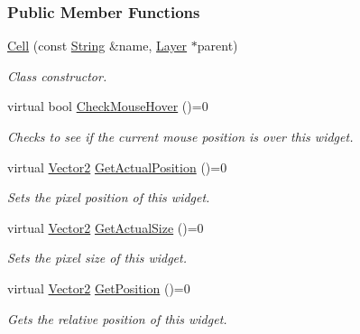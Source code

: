 \subsubsection*{Public Member Functions}
\begin{DoxyCompactItemize}
\item 
\hypertarget{classphys_1_1UI_1_1Cell_aef652c34ef1ea441cf00a4d757d41453}{
\hyperlink{classphys_1_1UI_1_1Cell_aef652c34ef1ea441cf00a4d757d41453}{Cell} (const \hyperlink{namespacephys_aa03900411993de7fbfec4789bc1d392e}{String} \&name, \hyperlink{classphys_1_1UI_1_1Layer}{Layer} $\ast$parent)}
\label{classphys_1_1UI_1_1Cell_aef652c34ef1ea441cf00a4d757d41453}

\begin{DoxyCompactList}\small\item\em Class constructor. \item\end{DoxyCompactList}\item 
virtual bool \hyperlink{classphys_1_1UI_1_1Cell_aff6472ccb5d6d7bd3e7d3a967c67674d}{CheckMouseHover} ()=0
\begin{DoxyCompactList}\small\item\em Checks to see if the current mouse position is over this widget. \item\end{DoxyCompactList}\item 
virtual \hyperlink{classphys_1_1Vector2}{Vector2} \hyperlink{classphys_1_1UI_1_1Cell_a1b0deb9738bc4da73e0be4dd355b23fb}{GetActualPosition} ()=0
\begin{DoxyCompactList}\small\item\em Sets the pixel position of this widget. \item\end{DoxyCompactList}\item 
virtual \hyperlink{classphys_1_1Vector2}{Vector2} \hyperlink{classphys_1_1UI_1_1Cell_a6301ce41a7a44a97de36fb54388ad430}{GetActualSize} ()=0
\begin{DoxyCompactList}\small\item\em Sets the pixel size of this widget. \item\end{DoxyCompactList}\item 
virtual \hyperlink{classphys_1_1Vector2}{Vector2} \hyperlink{classphys_1_1UI_1_1Cell_a17475dbdde2d71be3d774f0402792f0d}{GetPosition} ()=0
\begin{DoxyCompactList}\small\item\em Gets the relative position of this widget. \item\end{DoxyCompactList}\item 

\end{DoxyCompactItemize}
